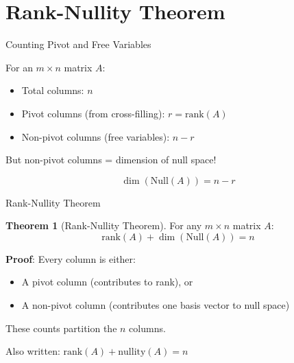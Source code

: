 \documentclass[10pt]{beamer}
\theoremstyle{definition}
\newtheorem{thm}{Theorem}[section]
\newcommand{\x}[1]{\alert{\textbf{#1}}}
\begin{document}
\section{Rank-Nullity Theorem}

\begin{frame}{Counting Pivot and Free Variables}

For an $m \times n$ matrix $A$:

\vspace{1em}

\begin{itemize}
\item Total columns: $n$
\item Pivot columns (from cross-filling): $r = \text{rank}(A)$
\item Non-pivot columns (free variables): $n - r$
\end{itemize}

\vspace{1em}

But non-pivot columns = dimension of null space!

\vspace{1em}

$$\dim(\text{Null}(A)) = n - r$$

\end{frame}

\begin{frame}{Rank-Nullity Theorem}

\begin{thm}[Rank-Nullity Theorem]
For any $m \times n$ matrix $A$:
$$\boxed{\text{rank}(A) + \dim(\text{Null}(A)) = n}$$
\end{thm}

\vspace{1em}

\x{Proof}: Every column is either:
\begin{itemize}
\item A pivot column (contributes to rank), or
\item A non-pivot column (contributes one basis vector to null space)
\end{itemize}

These counts partition the $n$ columns.

\vspace{1em}

Also written: $\text{rank}(A) + \text{nullity}(A) = n$

\end{frame}
\end{document}
